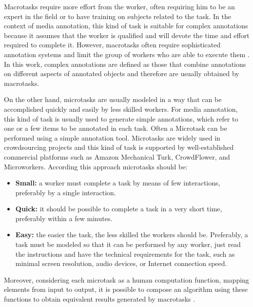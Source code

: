Macrotasks require more effort from the worker, often requiring him to be an expert in the field or to have training on subjects related to the task. In the context of media annotation, this kind of task is suitable for complex annotations because it assumes that the worker is qualified and will devote the time and effort required to complete it. However, macrotasks often require sophisticated annotation systems and limit the group of workers who are able to execute them \citep{Haas:2015:AMC:2824032.2824062}. In this work, complex annotations are defined as those that combine annotations on different aspects of annotated objects and therefore are usually obtained by macrotasks.

On the other hand, microtasks are usually modeled in a way that can be accomplished quickly and easily by less skilled workers. For media annotation, this kind of task is usually used to generate simple annotations, which refer to one or a few items to be annotated in each task. Often a Microtask can be performed using a simple annotation tool. Microtasks are widely used in crowdsourcing projects and this kind of task is supported by well-established commercial platforms such as Amazon Mechanical Turk, CrowdFlower, and Microworkers. According this approach microtasks should be:
\begin{itemize}
	\item{\textbf{Small:}} a worker must complete a task by means of few interactions, preferably by a single interaction.
	
	\item{\textbf{Quick:}} it should be possible to complete a task in a very short time, preferably within a few minutes.

	\item{\textbf{Easy:}} the easier the task, the less skilled the workers should be. Preferably, a task must be modeled so that it can be performed by any worker, just read the instructions and have the technical requirements for the task, such as minimal screen resolution, audio devices, or Internet connection speed.
\end{itemize}

Moreover, considering each microtask as a human computation function, mapping elements from input to output, it is possible to compose an algorithm using these functions to obtain equivalent results generated by macrotasks \cite{Chen:2017:RIM:3025453.3025969}.


